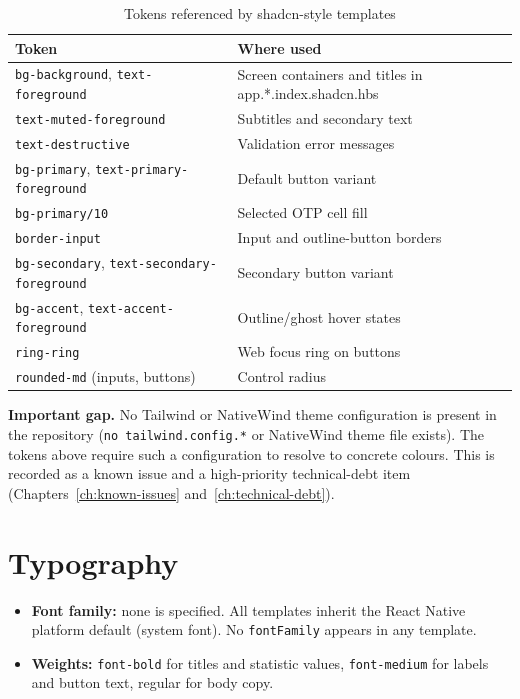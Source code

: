 \begin{table}[H]
\centering
\caption{Tokens referenced by shadcn-style templates}
\begin{tabular}{@{}L{4.4cm}L{9.4cm}@{}}
\toprule
\textbf{Token} & \textbf{Where used} \\
\midrule
\texttt{bg-background}, \texttt{text-foreground} & Screen containers and titles in
\ttfamily app.*.index.shadcn.hbs \\
\texttt{text-muted-foreground} & Subtitles and secondary text \\
\texttt{text-destructive} & Validation error messages \\
\texttt{bg-primary}, \texttt{text-primary-foreground} & Default button variant \\
\texttt{bg-primary/10} & Selected OTP cell fill \\
\texttt{border-input} & Input and outline-button borders \\
\texttt{bg-secondary}, \texttt{text-secondary-foreground} & Secondary button variant \\
\texttt{bg-accent}, \texttt{text-accent-foreground} & Outline/ghost hover states \\
\texttt{ring-ring} & Web focus ring on buttons \\
\texttt{rounded-md} (inputs, buttons) & Control radius \\
\bottomrule
\end{tabular}
\end{table}

\textbf{Important gap.} No Tailwind or NativeWind theme configuration is present in
the repository (\texttt{no tailwind.config.*} or NativeWind theme file exists).
The tokens above require such a configuration to resolve to concrete colours. This
is recorded as a known issue and a high-priority technical-debt item
(Chapters~\ref{ch:known-issues} and~\ref{ch:technical-debt}).

\section{Typography}

\begin{itemize}
  \item \textbf{Font family:} none is specified. All templates inherit the React
        Native platform default (system font). No \texttt{fontFamily} appears in any
        template.
  \item \textbf{Weights:} \texttt{font-bold} for titles and statistic values,
        \texttt{font-medium} for labels and button text, regular for body copy.
\end{itemize}

